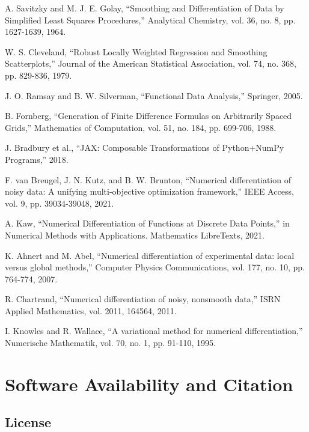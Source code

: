 \documentclass[10pt,journal,compsoc]{IEEEtran}
\begin{document}
\begin{thebibliography}{00}
 A. Savitzky and M. J. E. Golay, ``Smoothing and Differentiation of Data by Simplified Least Squares Procedures,'' Analytical Chemistry, vol. 36, no. 8, pp. 1627-1639, 1964.

 W. S. Cleveland, ``Robust Locally Weighted Regression and Smoothing Scatterplots,'' Journal of the American Statistical Association, vol. 74, no. 368, pp. 829-836, 1979.

 J. O. Ramsay and B. W. Silverman, ``Functional Data Analysis,'' Springer, 2005.

 B. Fornberg, ``Generation of Finite Difference Formulas on Arbitrarily Spaced Grids,'' Mathematics of Computation, vol. 51, no. 184, pp. 699-706, 1988.

 J. Bradbury et al., ``JAX: Composable Transformations of Python+NumPy Programs,'' 2018.

 F. van Breugel, J. N. Kutz, and B. W. Brunton, ``Numerical differentiation of noisy data: A unifying multi-objective optimization framework,'' IEEE Access, vol. 9, pp. 39034-39048, 2021.

 A. Kaw, ``Numerical Differentiation of Functions at Discrete Data Points,'' in Numerical Methods with Applications. Mathematics LibreTexts, 2021.

 K. Ahnert and M. Abel, ``Numerical differentiation of experimental data: local versus global methods,'' Computer Physics Communications, vol. 177, no. 10, pp. 764-774, 2007.

 R. Chartrand, ``Numerical differentiation of noisy, nonsmooth data,'' ISRN Applied Mathematics, vol. 2011, 164564, 2011.

 I. Knowles and R. Wallace, ``A variational method for numerical differentiation,'' Numerische Mathematik, vol. 70, no. 1, pp. 91-110, 1995.
\end{thebibliography}

\section*{Software Availability and Citation}

\subsection*{License}
\end{document}
